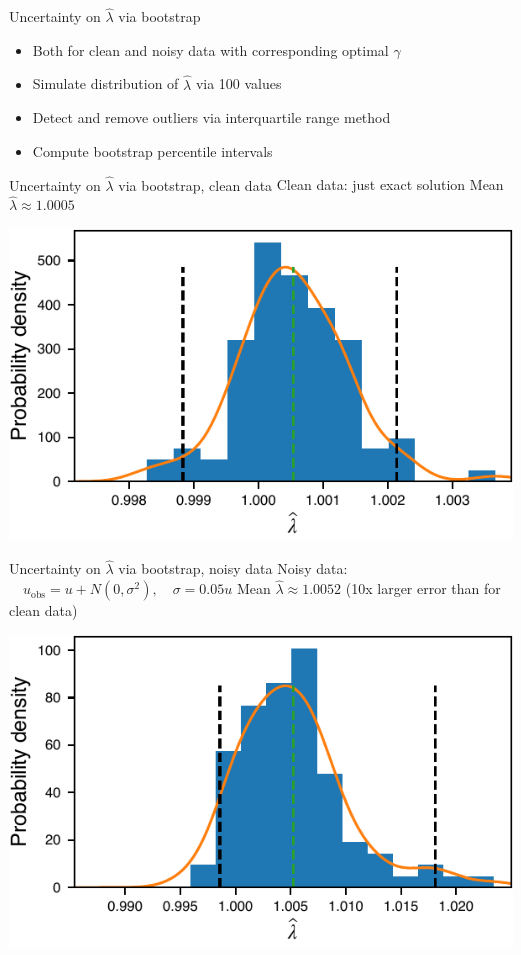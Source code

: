 \documentclass{beamer}
\def\\{}%
\begin{document}
\begin{frame}{Uncertainty on $\widehat \lambda$ via bootstrap}
\begin{itemize}
    \item Both for clean and noisy data with corresponding optimal $\gamma$
    \item Simulate distribution of $\widehat \lambda$ via 100 values
    \item Detect and remove outliers via interquartile range method
    \item Compute bootstrap percentile intervals
\end{itemize}
\end{frame}

\begin{frame}{Uncertainty on $\widehat \lambda$ via bootstrap, clean data}
\centering
Clean data: just exact solution\\
Mean $\widehat \lambda \approx 1.0005$

\vspace{0.1cm}
\includegraphics{images/heateq-bootstrap-clean}
\end{frame}

\begin{frame}{Uncertainty on $\widehat \lambda$ via bootstrap, noisy data}
\centering
Noisy data: $\quad u_{\text{obs}} = u +  N(0, \sigma^2), \quad \sigma=0.05u$\\
Mean $\widehat \lambda \approx 1.0052$ {\color{CRedD} (10x larger error than for clean data)}

\vspace{0.1cm}
\includegraphics{images/heateq-bootstrap-noise}
\end{frame}
\end{document}
